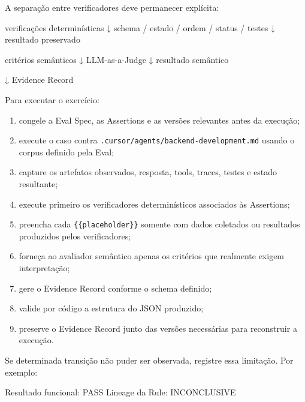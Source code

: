 \documentclass[
  10pt,
  a4paper,
  oneside]{book}
\newenvironment{Shaded}{}{}
\newcommand{\NormalTok}[1]{#1}
\providecommand{\tightlist}{%
  \setlength{\itemsep}{0pt}\setlength{\parskip}{0pt}}
\renewenvironment{Shaded}{\begin{snugshade}}{\end{snugshade}}%
\begin{document}
A separação entre verificadores deve permanecer explícita:

\begin{Shaded}
\begin{Highlighting}[]
\NormalTok{verificações determinísticas}
\NormalTok{        ↓}
\NormalTok{schema / estado / ordem / status / testes}
\NormalTok{        ↓}
\NormalTok{resultado preservado}

\NormalTok{critérios semânticos}
\NormalTok{        ↓}
\NormalTok{LLM{-}as{-}a{-}Judge}
\NormalTok{        ↓}
\NormalTok{resultado semântico}

\NormalTok{        ↓}
\NormalTok{Evidence Record}
\end{Highlighting}
\end{Shaded}

Para executar o exercício:

\begin{enumerate}
\def\labelenumi{\arabic{enumi}.}
\tightlist
\item
  congele a Eval Spec, as Assertions e as versões relevantes antes da
  execução;
\item
  execute o caso contra \texttt{.cursor/agents/backend-development.md}
  usando o corpus definido pela Eval;
\item
  capture os artefatos observados, resposta, tools, traces, testes e
  estado resultante;
\item
  execute primeiro os verificadores determinísticos associados às
  Assertions;
\item
  preencha cada \texttt{\{\{placeholder\}\}} somente com dados coletados
  ou resultados produzidos pelos verificadores;
\item
  forneça ao avaliador semântico apenas os critérios que realmente
  exigem interpretação;
\item
  gere o Evidence Record conforme o schema definido;
\item
  valide por código a estrutura do JSON produzido;
\item
  preserve o Evidence Record junto das versões necessárias para
  reconstruir a execução.
\end{enumerate}

Se determinada transição não puder ser observada, registre essa
limitação. Por exemplo:

\begin{Shaded}
\begin{Highlighting}[]
\NormalTok{Resultado funcional: PASS}
\NormalTok{Lineage da Rule: INCONCLUSIVE}
\end{Highlighting}
\end{Shaded}
\end{document}
